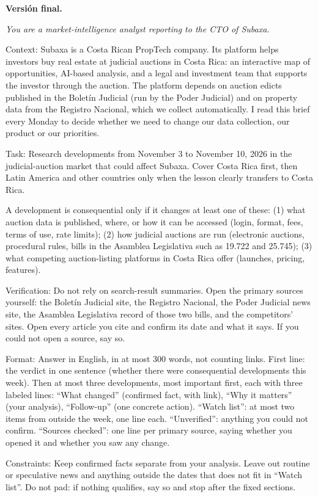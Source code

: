 \documentclass[11pt,letterpaper]{article}
\newenvironment{prompt}{%
  \begin{center}\begin{minipage}{0.92\textwidth}\color{black!80}\small
  \setlength{\parskip}{0.4em}\itshape}{%
  \end{minipage}\end{center}}
\begin{document}
\textbf{Versión final.}
\begin{prompt}
You are a market-intelligence analyst reporting to the CTO of Subaxa.

Context: Subaxa is a Costa Rican PropTech company. Its platform helps
investors buy real estate at judicial auctions in Costa Rica: an interactive
map of opportunities, AI-based analysis, and a legal and investment team that
supports the investor through the auction. The platform depends on auction
edicts published in the Boletín Judicial (run by the Poder Judicial) and on
property data from the Registro Nacional, which we collect automatically. I
read this brief every Monday to decide whether we need to change our data
collection, our product or our priorities.

Task: Research developments from November 3 to November 10, 2026 in the
judicial-auction market that could affect Subaxa. Cover Costa Rica first,
then Latin America and other countries only when the lesson clearly transfers
to Costa Rica.

A development is consequential only if it changes at least one of these:
(1) what auction data is published, where, or how it can be accessed (login,
format, fees, terms of use, rate limits); (2) how judicial auctions are run
(electronic auctions, procedural rules, bills in the Asamblea Legislativa
such as 19.722 and 25.745); (3) what competing auction-listing platforms in
Costa Rica offer (launches, pricing, features).

Verification: Do not rely on search-result summaries. Open the primary
sources yourself: the Boletín Judicial site, the Registro Nacional, the Poder
Judicial news site, the Asamblea Legislativa record of those two bills, and
the competitors' sites. Open every article you cite and confirm its date and
what it says. If you could not open a source, say so.

Format: Answer in English, in at most 300 words, not counting links. First
line: the verdict in one sentence (whether there were consequential
developments this week). Then at most three developments, most important
first, each with three labeled lines: \enquote{What changed} (confirmed fact,
with link), \enquote{Why it matters} (your analysis), \enquote{Follow-up}
(one concrete action). \enquote{Watch list}: at most two items from
outside the week, one line each. \enquote{Unverified}: anything you could
not confirm. \enquote{Sources checked}: one line per primary source, saying
whether you opened it and whether you saw any change.

Constraints: Keep confirmed facts separate from your analysis. Leave out
routine or speculative news and anything outside the dates that does not fit
in \enquote{Watch list}. Do not pad: if nothing qualifies, say so and stop
after the fixed sections.
\end{prompt}
\end{document}
